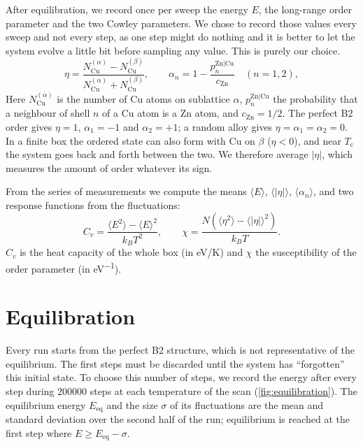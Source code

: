 \documentclass[11pt,a4paper]{article}
\newcommand{\Cu}{\mathrm{Cu}}
\newcommand{\Zn}{\mathrm{Zn}}
\newcommand{\Tc}{T_\mathrm{c}}
\begin{document}
After equilibration, we record once per sweep the energy $E$, the long-range order parameter and the two Cowley parameters. We chose to record those values every sweep and not every step, as one step might do nothing and it is better to let the system evolve a little bit before sampling any value. This is purely our choice.
\begin{equation}
  \eta = \frac{N_\Cu^{(\alpha)}-N_\Cu^{(\beta)}}{N_\Cu^{(\alpha)}+N_\Cu^{(\beta)}}, \qquad
  \alpha_n = 1-\frac{p_n^{\Zn|\Cu}}{c_\Zn}\quad (n=1,2),
\end{equation}
Here $N_\Cu^{(\alpha)}$ is the number of Cu atoms on sublattice $\alpha$, $p_n^{\Zn|\Cu}$ the probability that a neighbour of shell $n$ of a Cu atom is a Zn atom, and $c_\Zn=1/2$.
The perfect B2 order gives $\eta=1$, $\alpha_1=-1$ and $\alpha_2=+1$; a random alloy gives $\eta=\alpha_1=\alpha_2=0$.
In a finite box the ordered state can also form with Cu on $\beta$ ($\eta<0$), and near $\Tc$ the system goes back and forth between the two.
We therefore average $|\eta|$, which measures the amount of order whatever its sign.

From the series of measurements we compute the means $\langle E\rangle$, $\langle|\eta|\rangle$, $\langle\alpha_n\rangle$, and two response functions from the fluctuations:
\begin{equation}
  C_v = \frac{\langle E^2\rangle-\langle E\rangle^2}{k_BT^2},\qquad
  \chi = \frac{N\left(\langle\eta^2\rangle-\langle|\eta|\rangle^2\right)}{k_BT}.
  \label{eq:fluctuations}
\end{equation}
$C_v$ is the heat capacity of the whole box (in \si{eV/K}) and $\chi$ the susceptibility of the order parameter (in \si{eV^{-1}}).

\section{Equilibration}
\label{sec:equilibration}

Every run starts from the perfect B2 structure, which is not representative of the equilibrium.
The first steps must be discarded until the system has \enquote{forgotten} this initial state.
To choose this number of steps, we record the energy after every step during \num{200000} steps at each temperature of the scan (\cref{fig:equilibration}).
The equilibrium energy $E_\mathrm{eq}$ and the size $\sigma$ of its fluctuations are the mean and standard deviation over the second half of the run; equilibrium is reached at the first step where $E \ge E_\mathrm{eq}-\sigma$.
\end{document}
